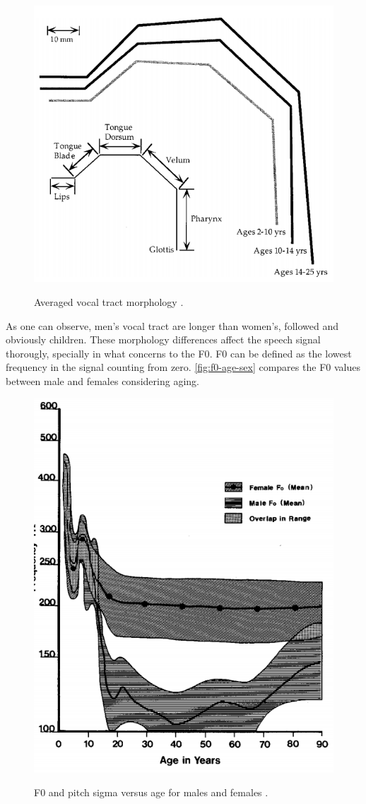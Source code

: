 \begin{figure}[H]
        \myfloatalign
        {\includegraphics[width=.66\linewidth]{gfx/vocal-tract-size-gender.png}}
        \caption{Averaged vocal tract morphology \cite{Fitch1999}.}
        \label{fig:vocal-tract-morphology}
\end{figure}

As one can observe, men's vocal tract are longer than women's, followed and obviously children. These morphology differences 
affect the speech signal thorougly, specially in what concerns to the \ac{F0}. \ac{F0} can be defined as the 
lowest frequency in the signal counting from zero. \autoref{fig:f0-age-sex} compares the \ac{F0} values
between male and females considering aging.

\begin{figure}[!ht]
        \myfloatalign
        {\includegraphics[width=.66\linewidth]{gfx/f0-age-sex.png}}
        \caption{F0 and pitch sigma versus age for males and females \cite{Brown1991}.}
        \label{fig:f0-age-sex}
\end{figure}

